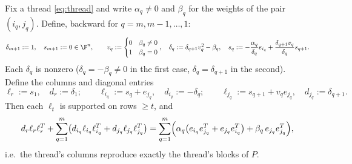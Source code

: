 \begin{lemma}\label{lem:telescope}
  Fix a thread \cref{eq:thread} and write $\alpha_q \neq 0$ and $\beta_q$
  for the weights of the pair $(i_q, j_q)$.  Define, backward for
  $q = m, m-1, \ldots, 1$:
  \[
    \delta_{m+1} := 1,
    \quad
    s_{m+1} := 0 \in \F^n,
    \qquad
    v_q :=
    \begin{cases}
      0 & \beta_q \neq 0\\
      1 & \beta_q = 0
    \end{cases},
    \quad
    \delta_q := \delta_{q+1} v_q^2 - \beta_q,
    \quad
    s_q := -\frac{\alpha_q}{\delta_q} e_{i_q}
    + \frac{\delta_{q+1} v_q}{\delta_q} s_{q+1} .
  \]
  Each $\delta_q$ is nonzero ($\delta_q = -\beta_q \neq 0$ in the first
  case, $\delta_q = \delta_{q+1}$ in the second).  Define the columns and
  diagonal entries
  \[
    \ell_r := s_1, \quad d_r := \delta_1;
    \qquad
    \ell_{i_q} := s_q + e_{j_q}, \quad d_{i_q} := -\delta_q;
    \qquad
    \ell_{j_q} := s_{q+1} + v_q e_{j_q}, \quad d_{j_q} := \delta_{q+1} .
  \]
  Then each $\ell_t$ is supported on rows $\ge t$, and
  \begin{equation}\label{eq:thread-sum}
    d_r \ell_r \ell_r^T
    + \sum_{q=1}^{m}
    \bigl( d_{i_q} \ell_{i_q} \ell_{i_q}^T + d_{j_q} \ell_{j_q}
    \ell_{j_q}^T \bigr)
    =
    \sum_{q=1}^{m}
    \Bigl( \alpha_q \bigl( e_{i_q} e_{j_q}^T + e_{j_q} e_{i_q}^T \bigr)
    + \beta_q \, e_{j_q} e_{j_q}^T \Bigr),
  \end{equation}
  i.e.\ the thread's columns reproduce exactly the thread's blocks of $P$.
\end{lemma}

